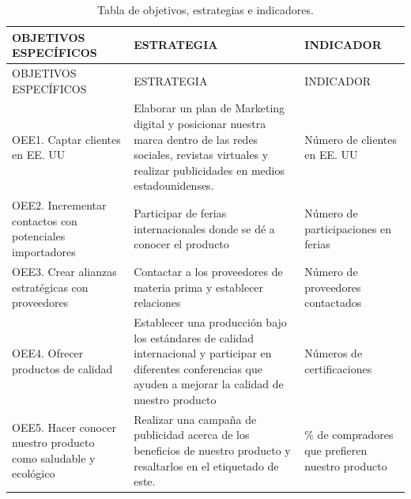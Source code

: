\documentclass[
  stu,
  floatsintext,
  longtable,
  a4paper,
  nolmodern,
  notxfonts,
  notimes,
  12pt,
  colorlinks=true,linkcolor=blue,citecolor=blue,urlcolor=blue]{apa7}
\begin{document}
\begin{longtable}[]{@{}
  >{\raggedright\arraybackslash}p{}
  >{\raggedright\arraybackslash}p{}
  >{\raggedright\arraybackslash}p{}@{}}
\caption{Tabla de objetivos, estrategias e indicadores.}\tabularnewline
\toprule\noalign{}
\begin{minipage}[b]{\linewidth}\raggedright
OBJETIVOS ESPECÍFICOS
\end{minipage} & \begin{minipage}[b]{\linewidth}\raggedright
ESTRATEGIA
\end{minipage} & \begin{minipage}[b]{\linewidth}\raggedright
INDICADOR
\end{minipage} \\
\midrule\noalign{}
\endfirsthead
\toprule\noalign{}
\begin{minipage}[b]{\linewidth}\raggedright
OBJETIVOS ESPECÍFICOS
\end{minipage} & \begin{minipage}[b]{\linewidth}\raggedright
ESTRATEGIA
\end{minipage} & \begin{minipage}[b]{\linewidth}\raggedright
INDICADOR
\end{minipage} \\
\midrule\noalign{}
\endhead
\bottomrule\noalign{}
\endlastfoot
OEE1. Captar clientes en EE. UU & Elaborar un plan de Marketing digital
y posicionar nuestra marca dentro de las redes sociales, revistas
virtuales y realizar publicidades en medios estadounidenses. & Número de
clientes en EE. UU \\
OEE2. Incrementar contactos con potenciales importadores & Participar de
ferias internacionales donde se dé a conocer el producto & Número de
participaciones en ferias \\
OEE3. Crear alianzas estratégicas con proveedores & Contactar a los
proveedores de materia prima y establecer relaciones & Número de
proveedores contactados \\
OEE4. Ofrecer productos de calidad & Establecer una producción bajo los
estándares de calidad internacional y participar en diferentes
conferencias que ayuden a mejorar la calidad de nuestro producto &
Números de certificaciones \\
OEE5. Hacer conocer nuestro producto como saludable y ecológico &
Realizar una campaña de publicidad acerca de los beneficios de nuestro
producto y resaltarlos en el etiquetado de este. & \% de compradores que
prefieren nuestro producto \\
\end{longtable}
\end{document}
